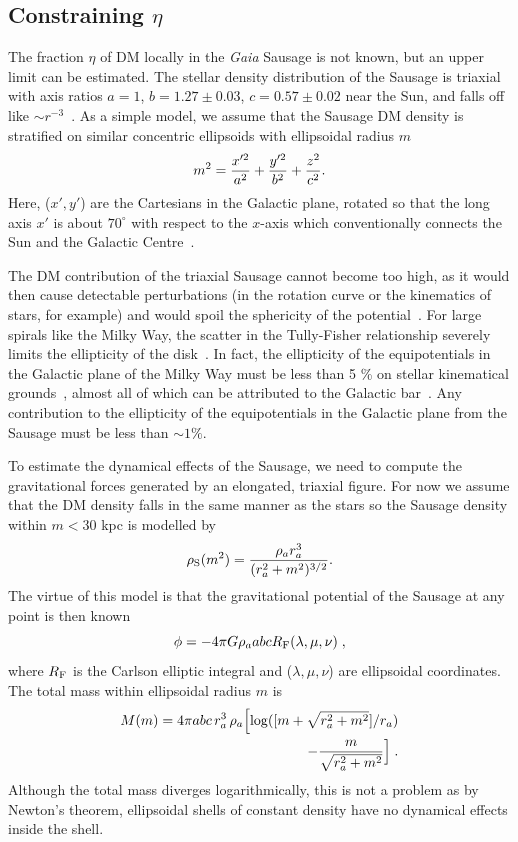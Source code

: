 \documentclass[prd,10pt,twocolumn,showpacs,nofootinbib, aps,superscriptaddress,preprintnumbers]{revtex4-1}
\newcommand{\rhoS}{\rho_{\rm S}}
\begin{document}
\subsection{Constraining $\eta$}
The fraction $\eta$ of DM locally in the \emph{Gaia} Sausage is not
known, but an upper limit can be estimated. The stellar
density distribution of the Sausage is triaxial with axis ratios $a =1
$, $b = 1.27\pm 0.03$, $c = 0.57 \pm 0.02$ near the Sun, and falls off
like $\sim r^{-3}$~\citep{Io18}. As a simple model, we assume that the
Sausage DM density is stratified on similar concentric ellipsoids with
ellipsoidal radius $m$
%
\begin{equation}
    m^2 = {x'^2\over a^2} + {y'^2\over b^2} + {z^2\over c^2}.
\end{equation}
%
Here, ($x',y'$) are the Cartesians in the Galactic plane, rotated so
that the long axis $x'$ is about $70^\circ$ with respect to the
$x$-axis which conventionally connects the Sun and the Galactic
Centre~\citep{Io18}.

The DM contribution of the triaxial Sausage cannot become too high, as
it would then cause detectable perturbations (in the rotation curve or
the kinematics of stars, for example) and would spoil the sphericity
of the potential~\citep{Ev16,We18}.  For large spirals like the Milky
Way, the scatter in the Tully-Fisher relationship severely limits the
ellipticity of the disk~\citep{Fr92}.  In fact, the ellipticity of the
equipotentials in the Galactic plane of the Milky Way must be less
than 5 \% on stellar kinematical grounds~\citep{Ku94}, almost
all of which can be attributed to the Galactic bar~\cite{Mu03}. Any
contribution to the ellipticity of the equipotentials in the Galactic
plane from the Sausage must be less than $\sim 1 \%$.

To estimate the dynamical effects of the Sausage, we need to compute
the gravitational forces generated by an elongated, triaxial figure.
For now we assume that the DM density falls in the same manner as the stars
 so the Sausage density within $m <30$ kpc is modelled by
%
\begin{equation}\label{eq:rhosos}
  \rhoS(m^2) = {\rho_a r_a^3\over (r_a^2+m^2)^{3/2}}.
\end{equation}
%
The virtue of this model is that the gravitational potential of the
Sausage at any point is then known~\citep{Chandra87}
%
\begin{equation}
  \phi = -4\pi G \rho_a abc R_{\rm F}(\lambda,\mu,\nu)\;,
\end{equation}
%
where $R_{\rm F}$ is the Carlson elliptic integral and
($\lambda,\mu,\nu$) are ellipsoidal coordinates.  The total mass
within ellipsoidal radius $m$ is
%
\begin{align}\label{eq:Mtot}
  M(m) = 4\pi a b c \, r_a^3\,\rho_a\Bigl[ \log( [m +\sqrt{r_a^2+m^2}] /r_a)\\
       -{m\over
      \sqrt{r_a^2+m^2}} \Bigr]\nonumber\;.
\end{align}
%
Although the total mass diverges logarithmically, this is not a
problem as by Newton's theorem, ellipsoidal shells of constant density
have no dynamical effects inside the shell.
\end{document}
